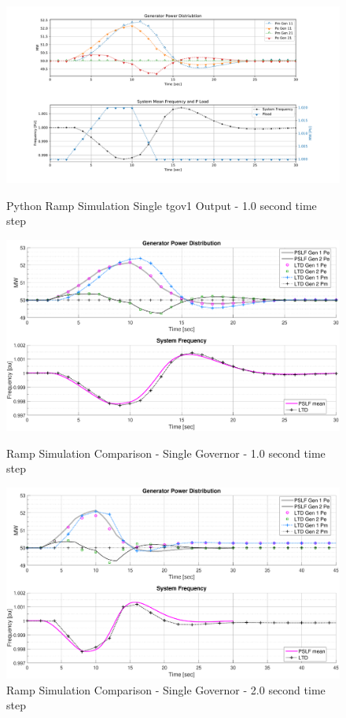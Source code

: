 \documentclass[12pt]{article}
\begin{document}
\pagebreak
\vspace{-1em}
	\begin{figure}[ht!]
	\begin{center}
		\includegraphics[width=.9\linewidth]{PY3ramp1sec}  \vspace{-2em}
		\caption{Python Ramp Simulation Single tgov1 Output - 1.0 second time step}
		\label{2gov1}\vspace{1.em}
		
		\includegraphics[width=.75\linewidth]{ramp1sec}  \vspace{-1em}
		\caption{Ramp Simulation Comparison - Single Governor - 1.0 second time step}
		\label{2gov2}\vspace{1.em}
		
		\includegraphics[width=.75\linewidth]{ramp2sec}  \vspace{-1em}
		\caption{Ramp Simulation Comparison - Single Governor - 2.0 second time step}
		\label{2gov3}\vspace{1em}
	\end{center}
\end{figure}
\end{document}
